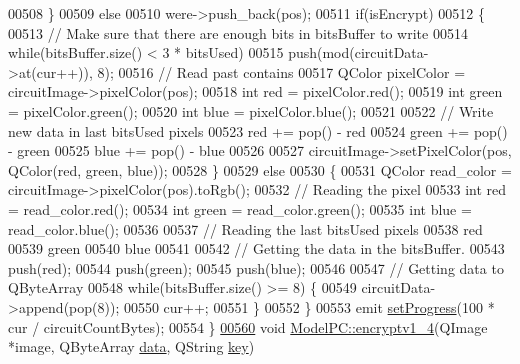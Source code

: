 \begin{DoxyCode}
00508     \}
00509     \textcolor{keywordflow}{else}
00510         were->push\_back(pos);
00511     \textcolor{keywordflow}{if}(isEncrypt)
00512     \{
00513         \textcolor{comment}{// Make sure that there are enough bits in bitsBuffer to write}
00514         \textcolor{keywordflow}{while}(bitsBuffer.size() < 3 * bitsUsed)
00515             push(mod(circuitData->at(cur++)), 8);
00516         \textcolor{comment}{// Read past contains}
00517         QColor pixelColor = circuitImage->pixelColor(pos);
00518         \textcolor{keywordtype}{int} red = pixelColor.red();
00519         \textcolor{keywordtype}{int} green = pixelColor.green();
00520         \textcolor{keywordtype}{int} blue = pixelColor.blue();
00521 
00522         \textcolor{comment}{// Write new data in last bitsUsed pixels}
00523         red += pop() - red %
00524         green += pop() - green %
00525         blue += pop() - blue %
00526 
00527         circuitImage->setPixelColor(pos, QColor(red, green, blue));
00528     \}
00529     \textcolor{keywordflow}{else}
00530     \{
00531         QColor read\_color = circuitImage->pixelColor(pos).toRgb();
00532         \textcolor{comment}{// Reading the pixel}
00533         \textcolor{keywordtype}{int} red = read\_color.red();
00534         \textcolor{keywordtype}{int} green = read\_color.green();
00535         \textcolor{keywordtype}{int} blue = read\_color.blue();
00536 
00537         \textcolor{comment}{// Reading the last bitsUsed pixels}
00538         red %
00539         green %
00540         blue %
00541 
00542         \textcolor{comment}{// Getting the data in the bitsBuffer.}
00543         push(red);
00544         push(green);
00545         push(blue);
00546 
00547         \textcolor{comment}{// Getting data to QByteArray}
00548         \textcolor{keywordflow}{while}(bitsBuffer.size() >= 8) \{
00549             circuitData->append(pop(8));
00550             cur++;
00551         \}
00552     \}
00553     emit \hyperlink{class_model_p_c_afdcd80f0ed5062e145a71f09b0897547}{setProgress}(100 * cur / circuitCountBytes);
00554 \}
\hypertarget{modelpc_8cpp_source.tex_l00560}{}\hyperlink{class_model_p_c_a4daefc3fb87a1f19172b9b20c987eb12}{00560} \textcolor{keywordtype}{void} \hyperlink{class_model_p_c_a4daefc3fb87a1f19172b9b20c987eb12}{ModelPC::encryptv1\_4}(QImage *image, QByteArray \hyperlink{namespace_errors_dict_setup_af570460846fb9f0c91abd308a095dcdc}{data}, QString 
      \hyperlink{namespace_errors_dict_setup_a09c268098d09ffb8e5504f30fa6d5dd9}{key})

\end{DoxyCode}
